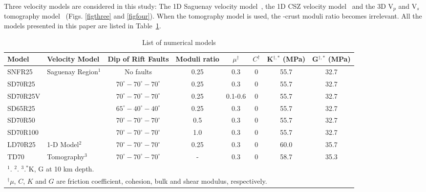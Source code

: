 \documentclass[draft]{agujournal2018}
\begin{document}
Three velocity models are considered in this study: The 1D Saguenay velocity model~\citep{Somerville1990}, the 1D CSZ velocity model~\citep{lamontagne1999} and the 3D V$_p$ and V$_s$ tomography model~\citep{Powell_2017} (Figs. \ref{figthree} and \ref{figfour}). When the tomography model is used, the -crust moduli ratio becomes irrelevant. All the models presented in this paper are listed in Table~\ref{tableone}.


\begin{table}
\caption{List of numerical models }
\centering
\begin{tabular}{llcccccc}
\hline
Model & Velocity Model & Dip of Rift Faults & Moduli ratio & $\mu^{\dagger}$ & $C^{\dagger}$ & K$^{\dagger,*}$ (MPa) & G$^{\dagger,*}$ (MPa) \\
\hline
SNFR25  & Saguenay Region$^{1}$ & No faults & 0.25 & 0.3 & 0 & 55.7 & 32.7  \\
SD70R25  &  & $70^\circ-70^\circ-70^\circ$  & 0.25 & 0.3 & 0 & 55.7 & 32.7 \\
SD70R25V  &  & $70^\circ-70^\circ-70^\circ$  & 0.25 & 0.1-0.6 & 0 & 55.7 & 32.7 \\
SD65R25  &  & $65^\circ-40^\circ-40^\circ$  & 0.25 & 0.3 & 0 & 55.7 & 32.7\\
SD70R50  &  & $70^\circ-70^\circ-70^\circ$  & 0.5 & 0.3 & 0 & 55.7 & 32.7 \\
SD70R100   &  & $70^\circ-70^\circ-70^\circ$  & 1.0 & 0.3 & 0 & 55.7 & 32.7 \\
LD70R25 & 1-D Model$^{2}$ & $70^\circ-70^\circ-70^\circ$ & 0.25 & 0.3  & 0 & 60.0 & 35.7 \\
TD70 & Tomography$^{3}$ & $70^\circ-70^\circ-70^\circ$ & - & 0.3 & 0 & 58.7 & 35.3 \\
\hline
\multicolumn{8}{l}{$^{1}$\citet{Somerville1990}. $^{2}$\citet{lamontagne1999}. $^{3}$\citet{Powell_2017}.$^{*}$K, G at 10 km depth.} \\
\multicolumn{8}{l}{$^{\dagger}$$\mu$, $C$, $K$ and $G$ are friction coefficient, cohesion, bulk and shear modulus, respectively.}

\end{tabular}
\label{tableone}
\end{table}


\end{document}
